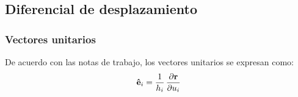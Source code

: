 \documentclass[12pt]{beamer}
\begin{document}
\subsection{Diferencial de desplazamiento}

\begin{frame}
\frametitle{Vectores unitarios}
De acuerdo con las notas de trabajo, los vectores unitarios se expresan como:
\pause
\begin{align*}
\vu{e}_{i} = \dfrac{1}{h_{i}} \, \pdv{\vb{r}}{u_{i}}
\end{align*}
\end{frame}

\end{document}

